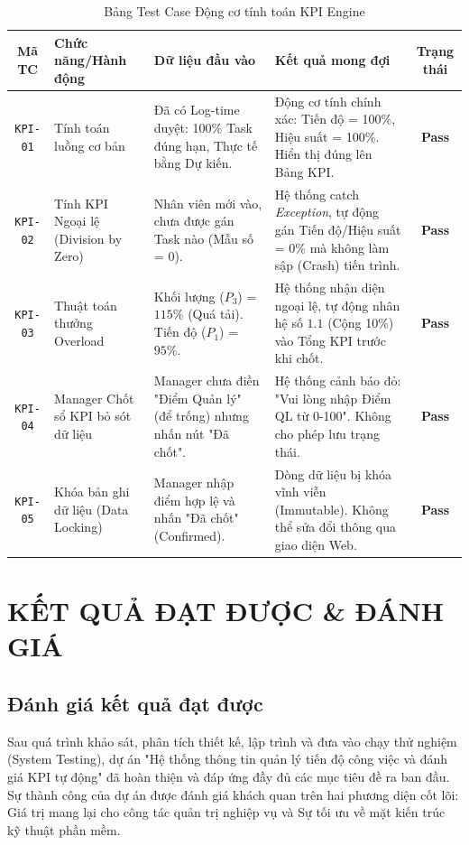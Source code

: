 \documentclass[a4paper,13.5pt]{extreport}
\begin{document}
\begin{table}[H]
    \centering
    \renewcommand{\arraystretch}{1.4}
    \begin{tabularx}{\textwidth}{|c|p{3.5cm}|X|X|c|}
    \hline
    \textbf{Mã TC} & \textbf{Chức năng/Hành động} & \textbf{Dữ liệu đầu vào} & \textbf{Kết quả mong đợi} & \textbf{Trạng thái} \\
    \hline
    \texttt{KPI-01} & Tính toán luồng cơ bản & Đã có Log-time duyệt: 100\% Task đúng hạn, Thực tế bằng Dự kiến. & Động cơ tính chính xác: Tiến độ = 100\%, Hiệu suất = 100\%. Hiển thị đúng lên Bảng KPI. & \textbf{Pass} \\
    \hline
    \texttt{KPI-02} & Tính KPI Ngoại lệ (Division by Zero) & Nhân viên mới vào, chưa được gán Task nào (Mẫu số = 0). & Hệ thống catch \textit{Exception}, tự động gán Tiến độ/Hiệu suất = 0\% mà không làm sập (Crash) tiến trình. & \textbf{Pass} \\
    \hline
    \texttt{KPI-03} & Thuật toán thưởng Overload & Khối lượng ($P_3$) = $115\%$ (Quá tải). Tiến độ ($P_1$) = $95\%$. & Hệ thống nhận diện ngoại lệ, tự động nhân hệ số $1.1$ (Cộng 10\%) vào Tổng KPI trước khi chốt. & \textbf{Pass} \\
    \hline
    \texttt{KPI-04} & Manager Chốt sổ KPI bỏ sót dữ liệu & Manager chưa điền "Điểm Quản lý" (để trống) nhưng nhấn nút "Đã chốt". & Hệ thống cảnh báo đỏ: "Vui lòng nhập Điểm QL từ 0-100". Không cho phép lưu trạng thái. & \textbf{Pass} \\
    \hline
    \texttt{KPI-05} & Khóa bản ghi dữ liệu (Data Locking) & Manager nhập điểm hợp lệ và nhấn "Đã chốt" (Confirmed). & Dòng dữ liệu bị khóa vĩnh viễn (Immutable). Không thể sửa đổi thông qua giao diện Web. & \textbf{Pass} \\
    \hline
    \end{tabularx}
    \caption{Bảng Test Case Động cơ tính toán KPI Engine}
    \label{tab:tc_kpi}
\end{table}

\chapter{KẾT QUẢ ĐẠT ĐƯỢC \& ĐÁNH GIÁ}

\section{Đánh giá kết quả đạt được}

Sau quá trình khảo sát, phân tích thiết kế, lập trình và đưa vào chạy thử nghiệm (System Testing), dự án "Hệ thống thông tin quản lý tiến độ công việc và đánh giá KPI tự động" đã hoàn thiện và đáp ứng đầy đủ các mục tiêu đề ra ban đầu. Sự thành công của dự án được đánh giá khách quan trên hai phương diện cốt lõi: Giá trị mang lại cho công tác quản trị nghiệp vụ và Sự tối ưu về mặt kiến trúc kỹ thuật phần mềm.
\end{document}
